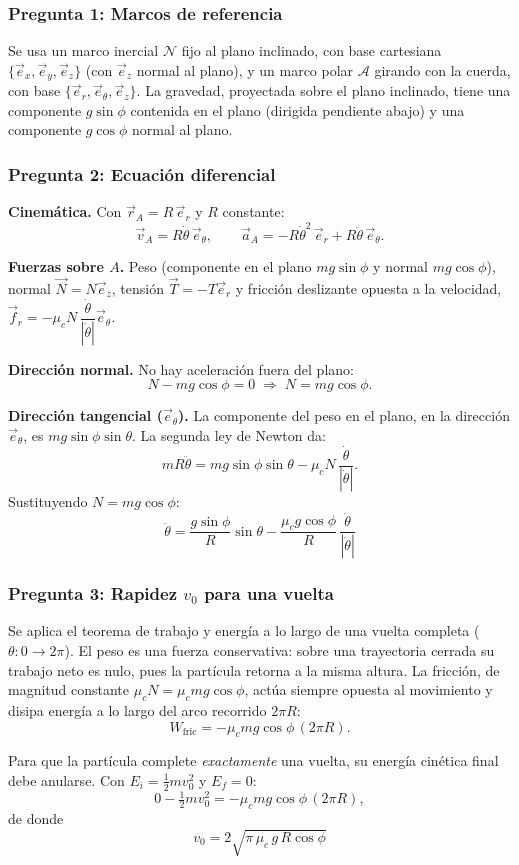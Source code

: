 \begin{sol}

\subsubsection*{Pregunta 1: Marcos de referencia}

Se usa un marco inercial $\mathcal{N}$ fijo al plano inclinado, con base cartesiana
$\{\vec{e}_x,\vec{e}_y,\vec{e}_z\}$ (con $\vec{e}_z$ normal al plano), y un marco polar
$\mathcal{A}$ girando con la cuerda, con base $\{\vec{e}_r,\vec{e}_\theta,\vec{e}_z\}$. La
gravedad, proyectada sobre el plano inclinado, tiene una componente $g\sin\phi$ contenida en
el plano (dirigida pendiente abajo) y una componente $g\cos\phi$ normal al plano.

\subsubsection*{Pregunta 2: Ecuación diferencial}

\textbf{Cinemática.} Con $\vec{r}_A = R\,\vec{e}_r$ y $R$ constante:
$$\vec{v}_A = R\dot\theta\,\vec{e}_\theta,\qquad
\vec{a}_A = -R\dot\theta^2\,\vec{e}_r + R\ddot\theta\,\vec{e}_\theta.$$

\textbf{Fuerzas sobre $A$.} Peso (componente en el plano $mg\sin\phi$ y normal $mg\cos\phi$),
normal $\vec{N}=N\vec{e}_z$, tensión $\vec{T}=-T\vec{e}_r$ y fricción deslizante opuesta a la
velocidad, $\vec{f}_r = -\mu_c N\,\dfrac{\dot\theta}{|\dot\theta|}\vec{e}_\theta$.

\textbf{Dirección normal.} No hay aceleración fuera del plano:
$$N - mg\cos\phi = 0 \;\Longrightarrow\; N = mg\cos\phi.$$

\textbf{Dirección tangencial ($\vec{e}_\theta$).} La componente del peso en el plano, en la
dirección $\vec{e}_\theta$, es $mg\sin\phi\sin\theta$. La segunda ley de Newton da:
$$m R\ddot\theta = mg\sin\phi\sin\theta - \mu_c N\,\frac{\dot\theta}{|\dot\theta|}.$$
Sustituyendo $N=mg\cos\phi$:
$$\boxed{\;\ddot\theta = \frac{g\sin\phi}{R}\sin\theta - \frac{\mu_c g\cos\phi}{R}\,\frac{\dot\theta}{|\dot\theta|}\;}$$

\subsubsection*{Pregunta 3: Rapidez $v_0$ para una vuelta}

Se aplica el teorema de trabajo y energía a lo largo de una vuelta completa
($\theta:0\to2\pi$). El peso es una fuerza conservativa: sobre una trayectoria cerrada su
trabajo neto es nulo, pues la partícula retorna a la misma altura. La fricción, de magnitud
constante $\mu_c N=\mu_c mg\cos\phi$, actúa siempre opuesta al movimiento y disipa energía a
lo largo del arco recorrido $2\pi R$:
$$W_{\text{fric}} = -\mu_c mg\cos\phi\,(2\pi R).$$

Para que la partícula complete \emph{exactamente} una vuelta, su energía cinética final debe
anularse. Con $E_i=\tfrac12 m v_0^2$ y $E_f=0$:
$$0 - \tfrac12 m v_0^2 = -\mu_c mg\cos\phi\,(2\pi R),$$
de donde
$$\boxed{\;v_0 = 2\sqrt{\pi\,\mu_c\,g\,R\cos\phi}\;}$$

\end{sol}
